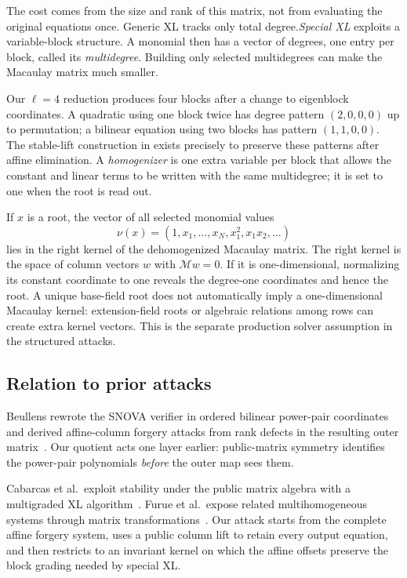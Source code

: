 \documentclass[11pt]{article}
\newcommand{\SNOVA}{\textsf{SNOVA}}
\begin{document}
The cost comes from the size and rank of this matrix, not from evaluating the
original equations once.  Generic XL tracks only total degree.\@  \emph{Special
XL} exploits a variable-block structure.  A monomial then has a vector of
degrees, one entry per block, called its \emph{multidegree}.  Building only
selected multidegrees can make the Macaulay matrix much smaller.

Our $\ell=4$ reduction produces four blocks after a change to eigenblock
coordinates.  A quadratic using one block twice has degree pattern
$(2,0,0,0)$ up to permutation; a bilinear equation using two blocks has pattern
$(1,1,0,0)$.  The stable-lift construction in
 exists precisely to preserve these patterns after
affine elimination.  A \emph{homogenizer} is one extra variable per block that
allows the constant and linear terms to be written with the same
multidegree; it is set to one when the root is read out.

If $x$ is a root, the vector of all selected monomial values
\[
  \nu(x)=(1,x_1,\ldots,x_N,x_1^2,x_1x_2,\ldots)
\]
lies in the right kernel of the dehomogenized Macaulay matrix.  The right
kernel is the space of column vectors $w$ with $\mathcal M w=0$.  If it is
one-dimensional, normalizing its constant coordinate to one reveals the
degree-one coordinates and hence the root.  A unique base-field root does
not automatically imply a one-dimensional Macaulay kernel: extension-field
roots or algebraic relations among rows can create extra kernel vectors.  This
is the separate production solver assumption in the structured attacks.

\subsection{Relation to prior attacks}\label{sec:related}

Beullens rewrote the \SNOVA{} verifier in ordered bilinear power-pair
coordinates and derived affine-column forgery attacks from rank defects in the
resulting outer matrix~\cite{Beullens2024SNOVA}.  Our quotient acts one layer
earlier: public-matrix symmetry identifies the power-pair polynomials
\emph{before} the outer map sees them.

Cabarcas et al.\ exploit stability under the public matrix algebra with a
multigraded XL algorithm~\cite{Cabarcas2025SNOVA}.  Furue et al.\ expose related
multihomogeneous systems through matrix transformations~\cite{FurueEtAl2025}.  Our attack starts from the complete affine forgery
system, uses a public column lift to retain every output equation, and then
restricts to an invariant kernel on which the affine offsets preserve the
block grading needed by special XL.\@
\end{document}

